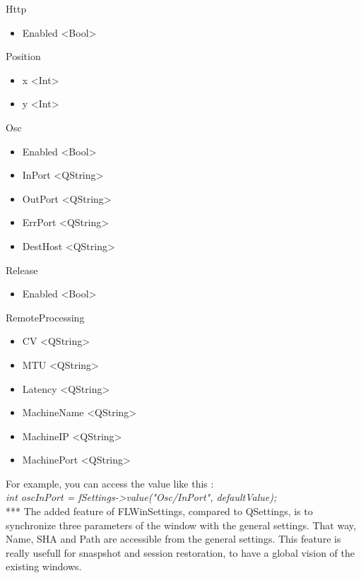 \documentclass[a4paper]{article}
\begin{document}
{\begin{itemize}
\begin{multicols}{2}
\item Http
	\begin{itemize}
		\item Enabled <Bool>
	\end{itemize}
	
\item Position
	\begin{itemize}
		\item x <Int>
		\item y <Int>
	\end{itemize}
	
\item Osc
	\begin{itemize}
		\item Enabled <Bool>
		\item InPort <QString>
		\item OutPort <QString>
		\item ErrPort <QString>
		\item DestHost <QString>
	\end{itemize}
	
\item Release
	\begin{itemize}
		\item Enabled <Bool>
	\end{itemize}
	
\item RemoteProcessing
	\begin{itemize}
		\item CV <QString>
		\item MTU <QString>
		\item Latency <QString>
		\item MachineName <QString>
		\item MachineIP <QString>
		\item MachinePort <QString>
	\end{itemize}
		
\end{multicols}
\end{itemize}

For example, you can access the value like this :\\
\textit{int oscInPort = fSettings->value("Osc/InPort", defaultValue);} \\

 *** The added feature of FLWinSettings, compared to QSettings, is to synchronize three parameters of the window with the general settings. That way, Name, SHA and Path are accessible from the general settings. This feature is really usefull for snaspshot and session restoration, to have a global vision of the existing windows.

}
\end{document}
